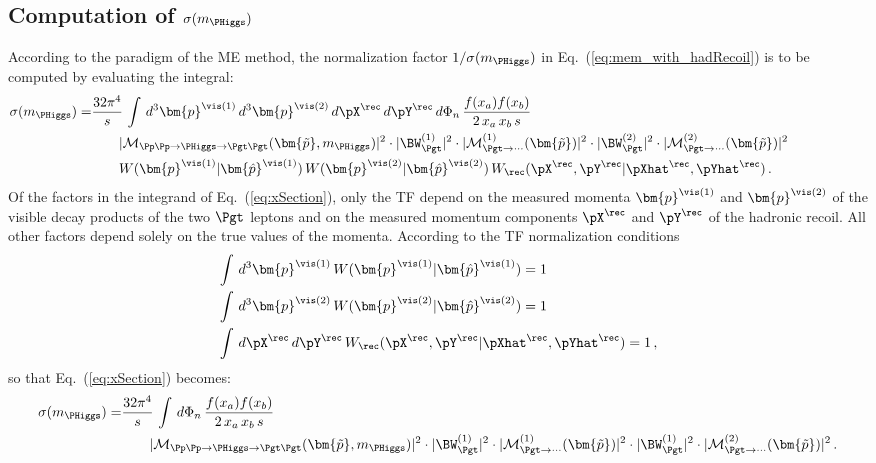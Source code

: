 \subsection{Computation of $\sigma(m_{\PHiggs})$}
\label{sec:mem_xSection}

According to the paradigm of the ME method, the normalization factor
$1/\sigma(m_{\PHiggs})$ in Eq.~(\ref{eq:mem_with_hadRecoil}) is to be computed
by evaluating the integral:
\begin{align}
\sigma(m_{\PHiggs}) = &
  \frac{32\pi^{4}}{s} \, \int \, d^{3}\bm{p}^{\vis(1)} \, d^{3}\bm{p}^{\vis(2)} \, d\pX^{\rec} \, d\pY^{\rec} \, 
  d\Phi_{n} \, \frac{f(x_{a}) f(x_{b})}{2 \, x_{a} \, x_{b} \, s} \, \hspace{2cm} \nonumber \\
& \qquad \vert \mathcal{M}_{\Pp\Pp \to \PHiggs \to \Pgt\Pgt}(\bm{\tilde{p}},m_{\PHiggs}) \vert^{2} 
  \cdot \vert \BW^{(1)}_{\Pgt} \vert^{2} \cdot \vert \mathcal{M}^{(1)}_{\Pgt\to\cdots}(\bm{\tilde{p}}) \vert^{2} 
  \cdot \vert \BW^{(2)}_{\Pgt} \vert^{2} \cdot \vert \mathcal{M}^{(2)}_{\Pgt\to\cdots}(\bm{\tilde{p}}) \vert^{2} \hspace{2cm} \nonumber \\
& \qquad W(\bm{p}^{\vis(1)}|\bm{\hat{p}}^{\vis(1)}) \, W(\bm{p}^{\vis(2)}|\bm{\hat{p}}^{\vis(2)}) \, W_{\rec}( \pX^{\rec},\pY^{\rec} | \pXhat^{\rec},\pYhat^{\rec} ) \, .
\label{eq:xSection}
\end{align}
Of the factors in the integrand of Eq.~(\ref{eq:xSection}),
only the TF depend on the measured momenta $\bm{p}^{\vis(1)}$ and $\bm{p}^{\vis(2)}$ of the visible decay products of the two $\Pgt$ leptons
and on the measured momentum components $\pX^{\rec}$ and $\pY^{\rec}$ of the hadronic recoil.
All other factors depend solely on the true values of the momenta.
According to the TF normalization conditions
\begin{align}
& \int \, d^{3}\bm{p}^{\vis(1)} \, W(\bm{p}^{\vis(1)}|\bm{\hat{p}}^{\vis(1)}) = 1 \nonumber \\
& \int \, d^{3}\bm{p}^{\vis(2)} \, W(\bm{p}^{\vis(2)}|\bm{\hat{p}}^{\vis(2)}) = 1 \nonumber \\
& \int \, d\pX^{\rec} \, d\pY^{\rec} \, W_{\rec}( \pX^{\rec},\pY^{\rec} | \pXhat^{\rec},\pYhat^{\rec} ) = 1 \, ,
\end{align}
so that Eq.~(\ref{eq:xSection}) becomes:
\begin{align}
\sigma(m_{\PHiggs}) = &
  \frac{32\pi^{4}}{s} \, \int \, 
  d\Phi_{n} \, \frac{f(x_{a}) f(x_{b})}{2 \, x_{a} \, x_{b} \, s} \,
  \hspace{2cm} \nonumber \\
& \qquad \vert \mathcal{M}_{\Pp\Pp \to \PHiggs \to
    \Pgt\Pgt}(\bm{\tilde{p}},m_{\PHiggs}) \vert^{2} 
  \cdot \vert \BW^{(1)}_{\Pgt} \vert^{2} \cdot \vert \mathcal{M}^{(1)}_{\Pgt\to\cdots}(\bm{\tilde{p}}) \vert^{2} 
  \cdot \vert \BW^{(1)}_{\Pgt} \vert^{2} \cdot \vert \mathcal{M}^{(2)}_{\Pgt\to\cdots}(\bm{\tilde{p}}) \vert^{2} \, .
\label{eq:xSection2}
\end{align}

